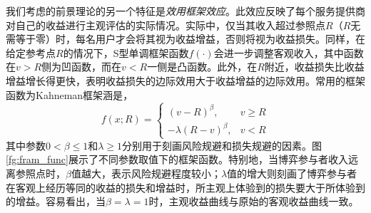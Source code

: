 我们考虑的前景理论的另一个特征是\emph{效用框架效应}。此效应反映了每个服务提供商对自己的收益进行主观评估的实际情况。实际中，仅当其收入超过参照点$R$（$R$无需等于零）时，每名用户才会将其视为收益增益，否则将视为收益损失。同样，在给定参考点$R$的情况下，S型单调框架函数$f(\cdot)$会进一步调整客观收入，其中函数在$v>R$侧为凹函数，而在$v<R$一侧是凸函数。此外，在$R$附近，收益损失比收益增益增长得更快，表明收益损失的边际效用大于收益增益的边际效用。常用的框架函数为Kahneman框架涵是\cite{Kahneman}，
\begin{equation}\label{eq:framing}
f(x;R)=
\begin{cases}
(v - R)^{\beta}, &v\geq R\\
-\lambda(R-v)^{\beta}, &v<R
\end{cases}
\end{equation}
其中参数$0<\beta\leq 1$和$\lambda\geq 1$分别用于刻画风险规避和损失规避的因素。图\ref{fg:fram_func}展示了不同参数取值下的框架函数。特别地，当博弈参与者收入远离参照点时，$\beta$值越大，表示风险规避程度较小；$\lambda$值的增大则刻画了博弈参与者在客观上经历等同的收益的损失和增益时，所主观上体验到的损失要大于所体验到的增益。容易看出，当$\beta=\lambda=1$时，主观收益曲线与原始的客观收益曲线一致。

